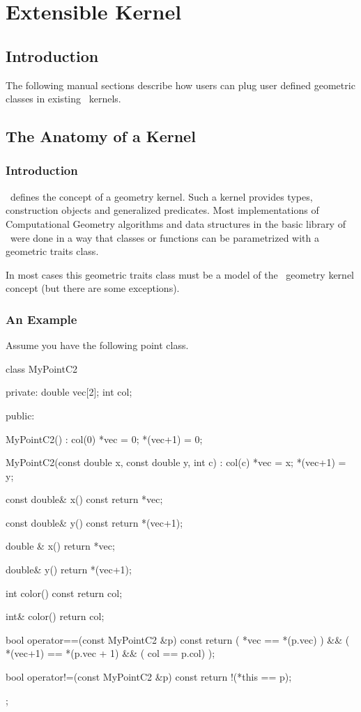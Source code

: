 \chapter{Extensible Kernel}

\section{Introduction}

The following manual sections describe how users can plug user defined
geometric classes in existing \cgal\ kernels.

\section{The Anatomy of a Kernel}

\subsection{Introduction}

\cgal\ defines the concept of a geometry kernel. Such a kernel provides types,
construction objects and generalized predicates. Most implementations
of Computational Geometry algorithms and data structures in the basic
library of \cgal\ were done in a way that classes or functions can be
parametrized with a geometric traits class.

In most cases this geometric traits class must be a model of the \cgal\ geometry
kernel concept (but there are some exceptions).



\subsection{An Example}

Assume you have the following point class.

\ccHtmlLinksOff
\begin{ccExampleCode}
class MyPointC2 {

private:
  double vec[2];
  int col;

public:

  MyPointC2()
    : col(0)
  {
    *vec = 0;
    *(vec+1) = 0;
  }

  
  MyPointC2(const double x, const double y, int c)
    : col(c)
  {
    *vec = x;
    *(vec+1) = y;
  }

  const double& x() const  { return *vec; }

  const double& y() const { return *(vec+1); }

  double & x() { return *vec; }

  double& y() { return *(vec+1); }

  int color() const { return col; }

  int& color() { return col; }
  
  
  bool operator==(const MyPointC2 &p) const
  {
    return ( *vec == *(p.vec) )  && ( *(vec+1) == *(p.vec + 1) && ( col == p.col) );
  }

  bool operator!=(const MyPointC2 &p) const
  {
      return !(*this == p);
  }

};
\end{ccExampleCode}
\ccHtmlLinksOn


